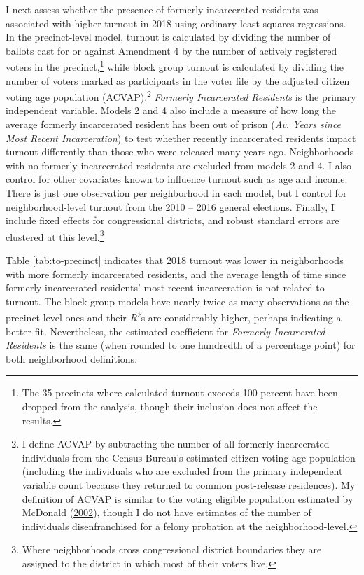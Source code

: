 \documentclass[
  12pt,
]{article}
\begin{document}
I next assess whether the presence of formerly incarcerated residents was associated with higher turnout in 2018 using ordinary least squares regressions. In the precinct-level model, turnout is calculated by dividing the number of ballots cast for or against Amendment 4 by the number of actively registered voters in the precinct,\footnote{The 35 precincts where calculated turnout exceeds 100 percent have been dropped from the analysis, though their inclusion does not affect the results.} while block group turnout is calculated by dividing the number of voters marked as participants in the voter file by the adjusted citizen voting age population (ACVAP).\footnote{I define ACVAP by subtracting the number of all formerly incarcerated individuals from the Census Bureau's estimated citizen voting age population (including the individuals who are excluded from the primary independent variable count because they returned to common post-release residences). My definition of ACVAP is similar to the voting eligible population estimated by McDonald (\protect\hyperlink{ref-McDonald2002}{2002}), though I do not have estimates of the number of individuals disenfranchised for a felony probation at the neighborhood-level.} \emph{Formerly Incarcerated Residents} is the primary independent variable. Models 2 and 4 also include a measure of how long the average formerly incarcerated resident has been out of prison (\emph{Av. Years since Most Recent Incarceration}) to test whether recently incarcerated residents impact turnout differently than those who were released many years ago. Neighborhoods with no formerly incarcerated residents are excluded from models 2 and 4. I also control for other covariates known to influence turnout such as age and income. There is just one observation per neighborhood in each model, but I control for neighborhood-level turnout from the 2010 -- 2016 general elections. Finally, I include fixed effects for congressional districts, and robust standard errors are clustered at this level.\footnote{Where neighborhoods cross congressional district boundaries they are assigned to the district in which most of their voters live.}

\begin{singlespace}


\end{singlespace}

Table \ref{tab:to-precinct} indicates that 2018 turnout was lower in neighborhoods with more formerly incarcerated residents, and the average length of time since formerly incarcerated residents' most recent incarceration is not related to turnout. The block group models have nearly twice as many observations as the precinct-level ones and their \emph{R\textsuperscript{2}}s are considerably higher, perhaps indicating a better fit. Nevertheless, the estimated coefficient for \emph{Formerly Incarcerated Residents} is the same (when rounded to one hundredth of a percentage point) for both neighborhood definitions.
\end{document}
